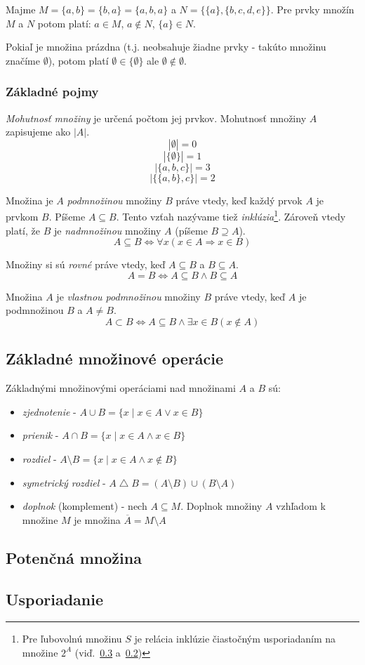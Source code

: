 \documentclass[a4paper,10pt]{article}
\begin{document}
	Majme $ M = \{a, b\} = \{b, a\} = \{a, b, a\} $ a $ N = \{\{a\}, \{b, c, d, e\}\} $. Pre prvky množín $M$ a $N$ potom platí: $ a \in M $, $a \not\in N$, $\{a\} \in N$.
	
	Pokiaľ je množina prázdna (t.j. neobsahuje žiadne prvky - takúto množinu značíme $\emptyset$), potom platí $\emptyset \in \{\emptyset\}$ ale $\emptyset \not\in \emptyset$.
	
		\subsubsection{Základné pojmy}
		\emph{Mohutnosť množiny} je určená počtom jej prvkov. Mohutnosť množiny $A$ zapisujeme ako $|A|$.
		$$|\emptyset| = 0$$
		$$|\{\emptyset\}| = 1$$
		$$|\{a,b,c\}| = 3$$
		$$|\{\{a, b\}, c\}| = 2$$
	
	Množina je $A$ \emph{podmnožinou} množiny $B$ práve vtedy, keď každý prvok $A$ je prvkom $B$. Píšeme $A \subseteq B$. Tento vzťah nazývame tiež \emph{inklúzia}\footnote{Pre ľubovolnú množinu $S$ je relácia inklúzie čiastočným usporiadaním na množine $2^{A}$ (viď.~\ref{usporiadanie} a~\ref{potencna_mnozina})}. Zároveň vtedy platí, že $B$ je \emph{nadmnožinou} množiny $A$ (píšeme $B \supseteq A$).
	$$A \subseteq B \Leftrightarrow \forall x(x \in A \Rightarrow x \in B)$$
	
	Množiny si sú \emph{rovné} práve vtedy, keď $A \subseteq B$ a $B \subseteq A$.
	$$A = B \Leftrightarrow A \subseteq B \land B \subseteq A$$
	
	Množina $A$ je \emph{vlastnou podmnožinou} množiny $B$ práve vtedy, keď $A$ je podmnožinou $B$ a $A \not= B$.
	$$A \subset B \Leftrightarrow A \subseteq B \land \exists x \in B(x \not\in A)$$
	\subsection{Základné množinové operácie}
	Základnými množinovými operáciami nad množinami $A$ a $B$ sú:
	\begin{itemize}
		\item \emph{zjednotenie} - $A \cup B = \{x \mid x \in A \lor x \in B \}$
		\item \emph{prienik} - $A \cap B = \{x \mid x \in A \land x \in B \}$
		\item \emph{rozdiel} - $A \setminus B = \{x \mid x \in A \land x \not\in B \}$
		\item \emph{symetrický rozdiel} - $A \bigtriangleup B = (A \setminus B) \cup (B \setminus A)$
		\item \emph{doplnok} (komplement) - nech $A \subseteq M$. Doplnok množiny $A$ vzhľadom k množine $M$ je množina $\overline{A} = M \setminus A$ 
	\end{itemize}
	\subsection{Potenčná množina}\label{potencna_mnozina}
	\subsection{Usporiadanie}\label{usporiadanie}
\end{document}
